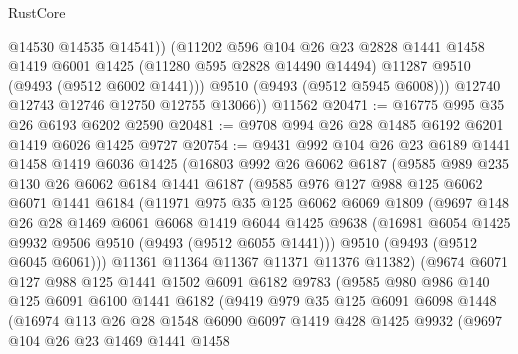 \begin{lexlean}{RustCore}
\begin{coremodule}
              @14530
              @14535
              @14541))
          (@11202
            @596
            @104
            @26
            @23
            @2828
            @1441
            @1458
            @1419
            @6001
            @1425
            (@11280 @595 @2828 @14490 @14494)
            @11287
            @9510
            (@9493 (@9512 @6002 @1441)))
          @9510
          (@9493 (@9512 @5945 @6008)))
        @12740
        @12743
        @12746
        @12750
        @12755
        @13066))
    @11562
@20471 := @16775 @995 @35 @26 @6193 @6202 @2590
@20481 := @9708 @994 @26 @28 @1485 @6192 @6201 @1419 @6026 @1425 @9727
@20754 := @9431
    @992
    @104
    @26
    @23
    @6189
    @1441
    @1458
    @1419
    @6036
    @1425
    (@16803
      @992
      @26
      @6062
      @6187
      (@9585
        @989
        @235
        @130
        @26
        @6062
        @6184
        @1441
        @6187
        (@9585
          @976
          @127
          @988
          @125
          @6062
          @6071
          @1441
          @6184
          (@11971
            @975
            @35
            @125
            @6062
            @6069
            @1809
            (@9697
              @148
              @26
              @28
              @1469
              @6061
              @6068
              @1419
              @6044
              @1425
              @9638
              (@16981 @6054 @1425 @9932 @9506 @9510 (@9493 (@9512 @6055 @1441)))
              @9510
              (@9493 (@9512 @6045 @6061)))
            @11361
            @11364
            @11367
            @11371
            @11376
            @11382)
          (@9674
            @6071
            @127
            @988
            @125
            @1441
            @1502
            @6091
            @6182
            @9783
            (@9585
              @980
              @986
              @140
              @125
              @6091
              @6100
              @1441
              @6182
              (@9419
                @979
                @35
                @125
                @6091
                @6098
                @1448
                (@16974
                  @113
                  @26
                  @28
                  @1548
                  @6090
                  @6097
                  @1419
                  @428
                  @1425
                  @9932
                  (@9697
                    @104
                    @26
                    @23
                    @1469
                    @1441
                    @1458

\end{coremodule}
\end{lexlean}
